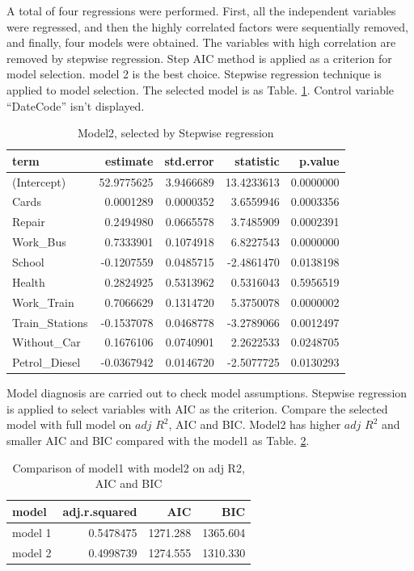 \documentclass[
]{article}
\begin{document}
A total of four regressions were performed. First, all the independent
variables were regressed, and then the highly correlated factors were
sequentially removed, and finally, four models were obtained. The
variables with high correlation are removed by stepwise regression. Step
AIC method is applied as a criterion for model selection. model 2 is the
best choice. Stepwise regression technique is applied to model
selection. The selected model is as Table. \ref{tab:model2}. Control
variable ``DateCode'' isn't displayed.

\begin{table}

\caption{\label{tab:unnamed-chunk-9}Model2, selected by Stepwise regression\label{tab:model2}}
\centering
\begin{tabular}[t]{l|r|r|r|r}
\hline
term & estimate & std.error & statistic & p.value\\
\hline
(Intercept) & 52.9775625 & 3.9466689 & 13.4233613 & 0.0000000\\
\hline
Cards & 0.0001289 & 0.0000352 & 3.6559946 & 0.0003356\\
\hline
Repair & 0.2494980 & 0.0665578 & 3.7485909 & 0.0002391\\
\hline
Work\_Bus & 0.7333901 & 0.1074918 & 6.8227543 & 0.0000000\\
\hline
School & -0.1207559 & 0.0485715 & -2.4861470 & 0.0138198\\
\hline
Health & 0.2824925 & 0.5313962 & 0.5316043 & 0.5956519\\
\hline
Work\_Train & 0.7066629 & 0.1314720 & 5.3750078 & 0.0000002\\
\hline
Train\_Stations & -0.1537078 & 0.0468778 & -3.2789066 & 0.0012497\\
\hline
Without\_Car & 0.1676106 & 0.0740901 & 2.2622533 & 0.0248705\\
\hline
Petrol\_Diesel & -0.0367942 & 0.0146720 & -2.5077725 & 0.0130293\\
\hline
\end{tabular}
\end{table}

Model diagnosis are carried out to check model assumptions. Stepwise
regression is applied to select variables with AIC as the criterion.
Compare the selected model with full model on \(adj\) \(R^2\), AIC and
BIC. Model2 has higher \(adj\) \(R^2\) and smaller AIC and BIC compared
with the model1 as Table. \ref{tab:com}.

\begin{table}

\caption{\label{tab:unnamed-chunk-10}Comparison of model1 with model2 on adj R2, AIC and BIC\label{tab:com}}
\centering
\begin{tabular}[t]{l|r|r|r}
\hline
model & adj.r.squared & AIC & BIC\\
\hline
model 1 & 0.5478475 & 1271.288 & 1365.604\\
\hline
model 2 & 0.4998739 & 1274.555 & 1310.330\\
\hline
\end{tabular}
\end{table}
\end{document}
